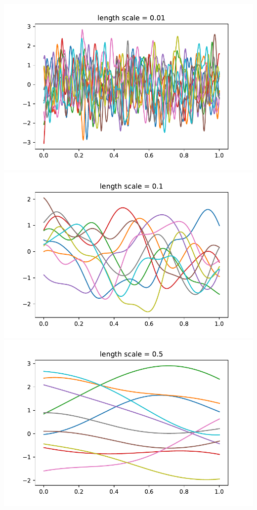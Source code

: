 \documentclass{beamer}
\begin{document}
\begin{frame}
\begin{columns}[t]
\centering
\includegraphics[height=0.3\textheight]{./img/RBF_sample001}
\includegraphics[height=0.3\textheight]{./img/RBF_sample01}
\includegraphics[height=0.3\textheight]{./img/RBF_sample05}

\end{columns}
\end{frame}
\end{document}
